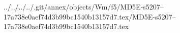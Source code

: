 ../../../../.git/annex/objects/Wm/f5/MD5E-s5207--17a738e0aef74d3b99bc1540b13157d7.tex/MD5E-s5207--17a738e0aef74d3b99bc1540b13157d7.tex